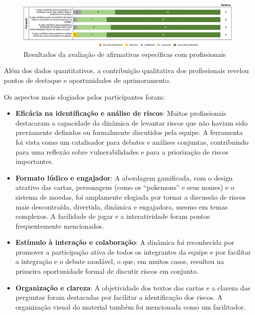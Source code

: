 \documentclass[
	12pt,
	openright,
	twoside,
	a4paper,
	english,
	brazil
	]{abntex2}
\begin{document}
\begin{figure}[H]
	\caption{\label{bridge-afirmativas} Resultados da avaliação de afirmativas específicas com profissionais}
  \includegraphics[width=\textwidth]{bridge-afirmativas}
\end{figure}

Além dos dados quantitativos, a contribuição qualitativa dos profissionais revelou pontos de destaque e oportunidades de aprimoramento.

Os aspectos mais elogiados pelos participantes foram:
\begin{itemize}
  \item \textbf{Eficácia na identificação e análise de riscos}: Muitos profissionais destacaram a capacidade da dinâmica de levantar riscos que não haviam sido previamente definidos ou formalmente discutidos pela equipe. A ferramenta foi vista como um catalisador para debates e análises conjuntas, contribuindo para uma reflexão sobre vulnerabilidades e para a priorização de riscos importantes.
  \item \textbf{Formato lúdico e engajador}: A abordagem gamificada, com o design atrativo das cartas, personagens (como os  “pokemons” e seus nomes) e o sistema de moedas, foi amplamente elogiada por tornar a discussão de riscos mais descontraída, divertida, dinâmica e engajadora, mesmo em temas complexos. A facilidade de jogar e a interatividade foram pontos frequentemente mencionados.
  \item \textbf{Estímulo à interação e colaboração}: A dinâmica foi reconhecida por promover a participação ativa de todos os integrantes da equipe e por facilitar a integração e o debate saudável, o que, em muitos casos, resultou na primeira oportunidade formal de discutir riscos em conjunto.
  \item \textbf{Organização e clareza}: A objetividade dos textos das cartas e a clareza das perguntas foram destacadas por facilitar a identificação dos riscos. A organização visual do material também foi mencionada como um facilitador.
\end{itemize}
\end{document}
